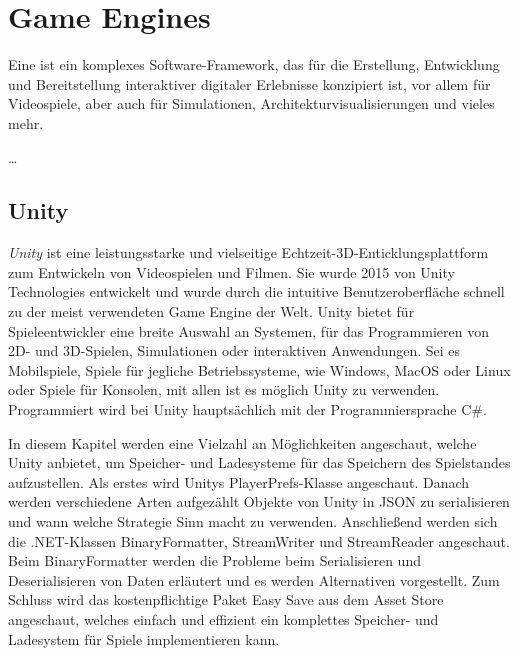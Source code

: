 \chapter{Game Engines}\label{ch:gameengines}
Eine  ist ein komplexes Software-Framework, das für die Erstellung, Entwicklung und Bereitstellung interaktiver digitaler Erlebnisse konzipiert ist, vor allem für Videospiele, aber auch für Simulationen, Architekturvisualisierungen und vieles mehr.

\dots


\section{Unity}
\textit{Unity} ist eine leistungsstarke und vielseitige Echtzeit-3D-Enticklungsplattform zum Entwickeln von Videospielen und Filmen. Sie wurde 2015 von Unity Technologies entwickelt und wurde durch die intuitive Benutzeroberfläche schnell zu der meist verwendeten Game Engine der Welt. Unity bietet für Spieleentwickler eine breite Auswahl an Systemen, für das Programmieren von 2D- und 3D-Spielen, Simulationen oder interaktiven Anwendungen. Sei es Mobilspiele, Spiele für jegliche Betriebssysteme, wie Windows, MacOS oder Linux oder Spiele für Konsolen, mit allen ist es möglich Unity zu verwenden. Programmiert wird bei Unity hauptsächlich mit der Programmiersprache C\#.\cite{unityUnityEngine}\cite{vsmid2017comparison}

In diesem Kapitel werden eine Vielzahl an Möglichkeiten angeschaut, welche Unity anbietet, um Speicher- und Ladesysteme für das Speichern des Spielstandes aufzustellen. Als erstes wird Unitys PlayerPrefs-Klasse angeschaut. Danach werden verschiedene Arten aufgezählt Objekte von Unity in JSON zu serialisieren und wann welche Strategie Sinn macht zu verwenden. Anschließend werden sich die .NET-Klassen BinaryFormatter, StreamWriter und StreamReader angeschaut. Beim BinaryFormatter werden die Probleme beim Serialisieren und Deserialisieren von Daten erläutert und es werden Alternativen vorgestellt. Zum Schluss wird das kostenpflichtige Paket Easy Save aus dem Asset Store angeschaut, welches einfach und effizient ein komplettes Speicher- und Ladesystem für Spiele implementieren kann.

